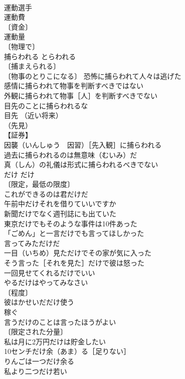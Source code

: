 \documentclass[8pt]{extreport}
\begin{document}
\begin{CJK}{UTF8}{min}
\\	運動選手 
\\	運動費 
\\	〔資金〕
\\	運動量 
\\	〔物理で〕
\\	捕らわれる	とらわれる	
\\	〔捕まえられる〕
\\	〔物事のとりこになる〕 恐怖に捕らわれて人々は逃げた 
\\	感情に捕らわれて物事を判断すべきではない 
\\	外観に捕らわれて物事［人］を判断すべきでない 
\\	目先のことに捕らわれるな 
\\	目先 （近い将来）
\\	（先見）
\\	【証券】
\\	因襲（いんしゅう　因習）［先入観］に捕らわれる 
\\	過去に捕らわれるのは無意味（むいみ）だ 
\\	真（しん）の礼儀は形式に捕らわれるべきでない 
\\	だけ	だけ	
\\	〔限定，最低の限度〕
\\	これができるのは君だけだ 
\\	午前中だけそれを借りていいですか 
\\	新聞だけでなく週刊誌にも出ていた 
\\	東京だけでもそのような事件は10件あった 
\\	「ごめん」と一言だけでも言ってほしかった 
\\	言ってみただけだ 
\\	一目（いちめ）見ただけでその家が気に入った 
\\	そう言った［それを見た］だけで彼は怒った 
\\	一回見せてくれるだけでいい 
\\	やるだけはやってみなさい 
\\	〔程度〕　
\\	彼はかせいだだけ使う 
\\	稼ぐ　
\\	言うだけのことは言ったほうがよい 
\\	〔限定された分量〕　
\\	私は月に2万円だけは貯金したい 
\\	10センチだけ余（あま）る［足りない］ 
\\	りんごは一つだけ余る 
\\	私より二つだけ若い 

\end{CJK}
\end{document}
